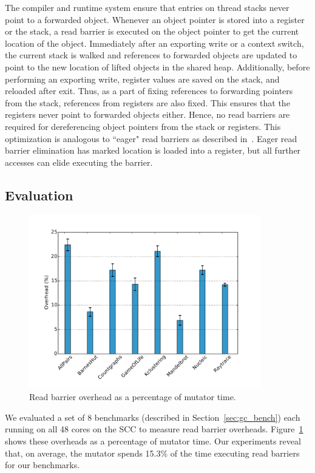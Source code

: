 The compiler and runtime system ensure that entries on thread stacks never
point to a forwarded object. Whenever an object pointer is stored into a
register or the stack, a read barrier is executed on the object pointer to get
the current location of the object. Immediately after an exporting write or a
context switch, the current stack is walked and references to forwarded objects
are updated to point to the new location of lifted objects in the shared heap.
Additionally, before performing an exporting write, register values are saved
on the stack, and reloaded after exit. Thus, as a part of fixing references to
forwarding pointers from the stack, references from registers are also fixed.
This ensures that the registers never point to forwarded objects either. Hence,
no read barriers are required for dereferencing object pointers from the stack
or registers. This optimization is analogous to ``eager" read barriers as
described in~\cite{Bacon03}. Eager read barrier elimination has marked
location is loaded into a register, but all further accesses can elide
executing the barrier.

\subsection{Evaluation}

\begin{figure}
  \centering
  \includegraphics[width=0.9\textwidth]{Graphs/RB_overhead}
	\caption{Read barrier overhead as a percentage of mutator time.}
  \label{fig:rb-overhead}
\end{figure}

We evaluated a set of 8 benchmarks (described in Section~\ref{sec:gc_bench})
each running on all 48 cores on the SCC to measure read barrier overheads.
Figure~\ref{fig:rb-overhead} shows these overheads as a percentage of mutator
time. Our experiments reveal that, on average, the mutator spends 15.3\% of the
time executing read barriers for our benchmarks.

